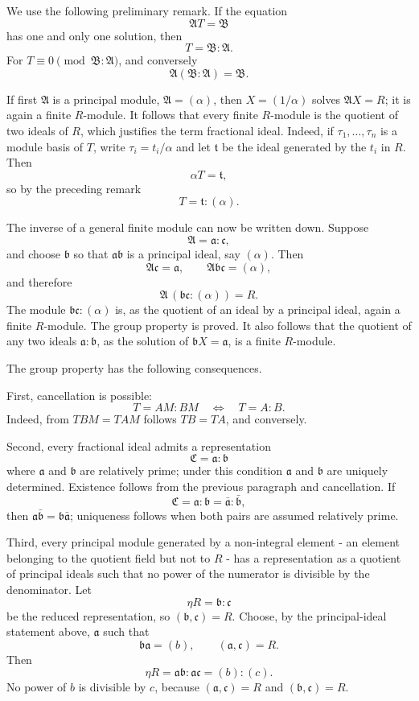 \documentclass[
  12pt,
]{article}
\begin{document}
We use the following preliminary remark. If the equation \[
  \mathfrak A T=\mathfrak B
\] has one and only one solution, then \[
  T=\mathfrak B:\mathfrak A.
\] For \(T\equiv0\pmod{\mathfrak B:\mathfrak A}\), and conversely \[
  \mathfrak A(\mathfrak B:\mathfrak A)=\mathfrak B.
\]

If first \(\mathfrak A\) is a principal module,
\(\mathfrak A=(\alpha)\), then \(X=(1/\alpha)\) solves
\(\mathfrak A X=R\); it is again a finite \(R\)-module. It follows that
every finite \(R\)-module is the quotient of two ideals of \(R\), which
justifies the term fractional ideal. Indeed, if \(\tau_1,\ldots,\tau_n\)
is a module basis of \(T\), write \(\tau_i=t_i/\alpha\) and let
\(\mathfrak t\) be the ideal generated by the \(t_i\) in \(R\). Then \[
  \alpha T=\mathfrak t,
\] so by the preceding remark \[
  T=\mathfrak t:(\alpha).
\]

The inverse of a general finite module can now be written down. Suppose
\[
  \mathfrak A=\mathfrak a:\mathfrak c,
\] and choose \(\mathfrak b\) so that \(\mathfrak a\mathfrak b\) is a
principal ideal, say \((\alpha)\). Then \[
  \mathfrak A\mathfrak c=\mathfrak a,
  \qquad \mathfrak A\mathfrak b\mathfrak c=(\alpha),
\] and therefore \[
  \mathfrak A\, (\mathfrak b\mathfrak c:(\alpha))=R.
\] The module \(\mathfrak b\mathfrak c:(\alpha)\) is, as the quotient of
an ideal by a principal ideal, again a finite \(R\)-module. The group
property is proved. It also follows that the quotient of any two ideals
\(\mathfrak a:\mathfrak b\), as the solution of
\(\mathfrak bX=\mathfrak a\), is a finite \(R\)-module.

The group property has the following consequences.

First, cancellation is possible: \[
  T=AM:BM \quad\Longleftrightarrow\quad T=A:B.
\] Indeed, from \(TBM=TAM\) follows \(TB=TA\), and conversely.

Second, every fractional ideal admits a representation \[
  \mathfrak C=\mathfrak a:\mathfrak b
\] where \(\mathfrak a\) and \(\mathfrak b\) are relatively prime; under
this condition \(\mathfrak a\) and \(\mathfrak b\) are uniquely
determined. Existence follows from the previous paragraph and
cancellation. If \[
  \mathfrak C=\mathfrak a:\mathfrak b=\bar{\mathfrak a}:\bar{\mathfrak b},
\] then \(\mathfrak a\bar{\mathfrak b}=\mathfrak b\bar{\mathfrak a}\);
uniqueness follows when both pairs are assumed relatively prime.

Third, every principal module generated by a non-integral element - an
element belonging to the quotient field but not to \(R\) - has a
representation as a quotient of principal ideals such that no power of
the numerator is divisible by the denominator. Let \[
  \eta R=\mathfrak b:\mathfrak c
\] be the reduced representation, so \((\mathfrak b,\mathfrak c)=R\).
Choose, by the principal-ideal statement above, \(\mathfrak a\) such
that \[
  \mathfrak b\mathfrak a=(b),
  \qquad (\mathfrak a,\mathfrak c)=R.
\] Then \[
  \eta R=\mathfrak a\mathfrak b:\mathfrak a\mathfrak c=(b):(c).
\] No power of \(b\) is divisible by \(c\), because
\((\mathfrak a,\mathfrak c)=R\) and \((\mathfrak b,\mathfrak c)=R\).
\end{document}
